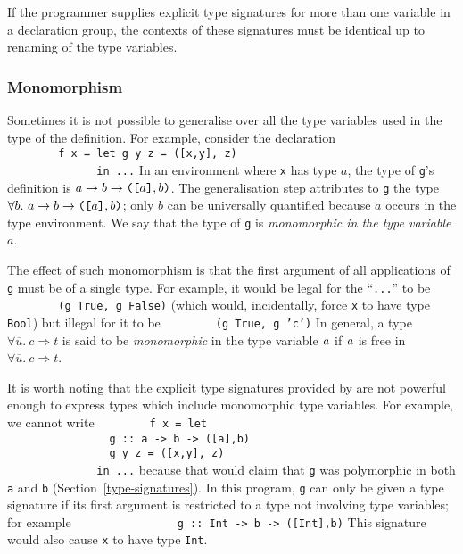 If the programmer supplies explicit type signatures for more than one variable
in a declaration group, the contexts of these signatures must be 
identical up to renaming of the type variables.

\subsubsection{Monomorphism}

Sometimes it is not possible to generalise over all the type variables
used in the type of the definition.
For example, consider the declaration\nopagebreak[4]
\bprog
\mbox{\tt \ \ \ \ \ \ \ \ f\ x\ =\ let\ g\ y\ z\ =\ ([x,y],\ z)}\\
\mbox{\tt \ \ \ \ \ \ \ \ \ \ \ \ \ \ in\ ...}
\eprog
In an environment where \mbox{\tt x} has type $a$,
the type of \mbox{\tt g}'s definition is 
$a \rightarrow b \rightarrow \mbox{\tt ([}a\mbox{\tt ]},b\mbox{\tt )}$.
The generalisation step attributes to \mbox{\tt g} the type 
$\forall b.~ a \rightarrow b \rightarrow \mbox{\tt ([}a\mbox{\tt ]},b\mbox{\tt )}$;
only $b$ can be universally quantified because $a$ occurs in the
type environment.
We say that the type of \mbox{\tt g} is {\em monomorphic in the type variable $a$}.

The effect of such monomorphism is that the first argument of all 
applications of \mbox{\tt g} must be of a single type.  
For example, it would be legal for
the ``\mbox{\tt ...}'' to be
\bprog
\mbox{\tt \ \ \ \ \ \ \ \ (g\ True,\ g\ False)}
\eprog
(which would, incidentally, force \mbox{\tt x} to have type \mbox{\tt Bool}) but illegal for it to be
\bprog
\mbox{\tt \ \ \ \ \ \ \ \ (g\ True,\ g\ 'c')}
\eprog
In general, a type $\forall \overline{u}.~c \Rightarrow t$
is said to be {\em monomorphic}
in the type variable \mbox{$\it a$} if \mbox{$\it a$} is free in
$\forall \overline{u}.~c \Rightarrow t$.

It is worth noting that the explicit type signatures provided by \Haskell{}
are not powerful enough to express types which include monomorphic type
variables.  For example, we cannot write
\bprog
\mbox{\tt \ \ \ \ \ \ \ \ f\ x\ =\ let\ }\\
\mbox{\tt \ \ \ \ \ \ \ \ \ \ \ \ \ \ \ \ g\ ::\ a\ ->\ b\ ->\ ([a],b)}\\
\mbox{\tt \ \ \ \ \ \ \ \ \ \ \ \ \ \ \ \ g\ y\ z\ =\ ([x,y],\ z)}\\
\mbox{\tt \ \ \ \ \ \ \ \ \ \ \ \ \ \ in\ ...}
\eprog
because that would claim that \mbox{\tt g} was polymorphic in both \mbox{\tt a} and \mbox{\tt b}
(Section~\ref{type-signatures}).  In this program, \mbox{\tt g} can only be given
a type signature if its first argument is restricted to a type not involving
type variables; for example
\bprog
\mbox{\tt \ \ \ \ \ \ \ \ \ \ \ \ \ \ \ \ g\ ::\ Int\ ->\ b\ ->\ ([Int],b)}
\eprog
This signature would also cause \mbox{\tt x} to have type \mbox{\tt Int}.

